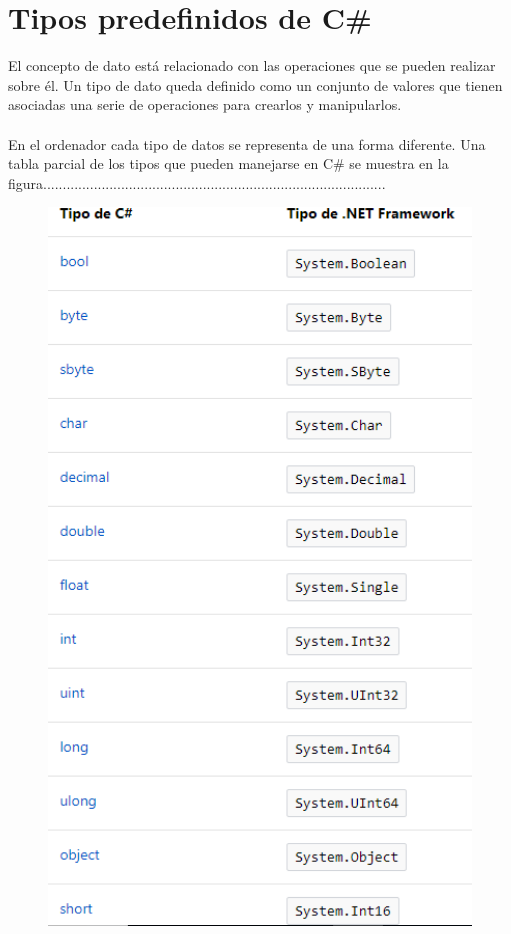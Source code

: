\documentclass[12pt,a4paper]{report}
\begin{document}
{\section{Tipos predefinidos de C\#}
El concepto de dato está relacionado con las operaciones que se pueden realizar sobre él. Un tipo de dato queda definido como un conjunto de valores que tienen asociadas una serie de operaciones para crearlos y manipularlos.\\\\En el ordenador cada tipo de datos se representa de una forma diferente. Una tabla parcial de los tipos que pueden manejarse en C\# se muestra en la figura........................................................................................
\begin{figure}[hbtp]
\centering
\includegraphics[width=16cm]{Csh_Imagenes/Tabla_Tipos.png}

\end{figure}}
\end{document}
